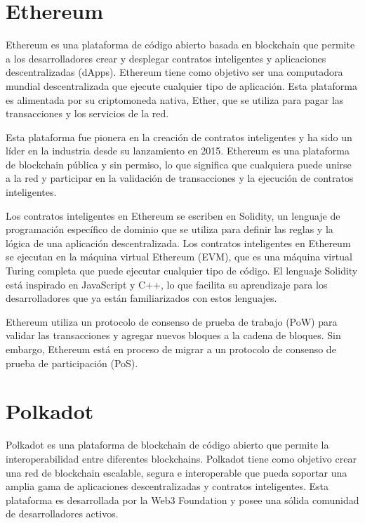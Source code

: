 \documentclass{article}
\begin{document}
\section{Ethereum}

Ethereum es una plataforma de código abierto basada en blockchain que permite a los desarrolladores crear y desplegar contratos inteligentes y aplicaciones descentralizadas (dApps). Ethereum tiene como objetivo ser una computadora mundial descentralizada que ejecute cualquier tipo de aplicación. Esta plataforma es alimentada por su criptomoneda nativa, Ether, que se utiliza para pagar las transacciones y los servicios de la red.

Esta plataforma fue pionera en la creación de contratos inteligentes y ha sido un líder en la industria desde su lanzamiento en 2015. Ethereum es una plataforma de blockchain pública y sin permiso, lo que significa que cualquiera puede unirse a la red y participar en la validación de transacciones y la ejecución de contratos inteligentes. 

Los contratos inteligentes en Ethereum se escriben en Solidity, un lenguaje de programación específico de dominio que se utiliza para definir las reglas y la lógica de una aplicación descentralizada. Los contratos inteligentes en Ethereum se ejecutan en la máquina virtual Ethereum (EVM), que es una máquina virtual Turing completa que puede ejecutar cualquier tipo de código. El lenguaje Solidity está inspirado en JavaScript y C++, lo que facilita su aprendizaje para los desarrolladores que ya están familiarizados con estos lenguajes.

Ethereum utiliza un protocolo de consenso de prueba de trabajo (PoW) para validar las transacciones y agregar nuevos bloques a la cadena de bloques. Sin embargo, Ethereum está en proceso de migrar a un protocolo de consenso de prueba de participación (PoS). 

\section{Polkadot}

Polkadot es una plataforma de blockchain de código abierto que permite la interoperabilidad entre diferentes blockchains. Polkadot tiene como objetivo crear una red de blockchain escalable, segura e interoperable que pueda soportar una amplia gama de aplicaciones descentralizadas y contratos inteligentes. Esta plataforma es desarrollada por la Web3 Foundation y posee una sólida comunidad de desarrolladores activos.
\end{document}
